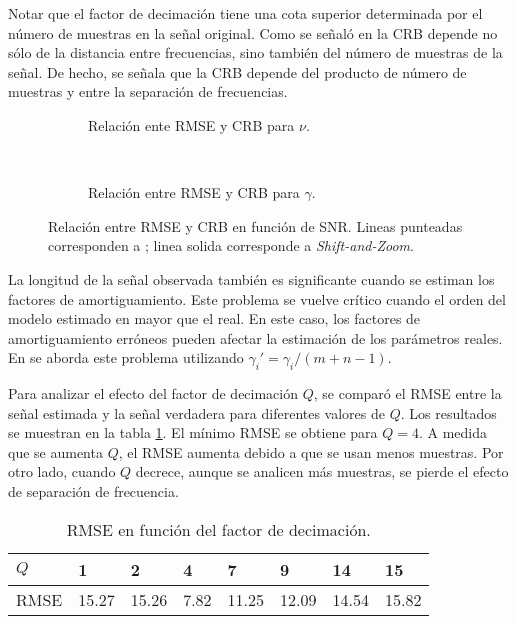			Notar que el factor de decimación tiene una cota superior determinada por el número de muestras en la señal original. Como se señaló en \cite{Yao1995} la CRB depende no sólo de la distancia entre frecuencias, sino también del número de muestras de la señal. De hecho, se señala que la CRB depende del producto de número de muestras y entre la separación de frecuencias.
			\begin{figure}[t]
				\begin{subfigure}{0.5\textwidth}
					\centering	
					\resizebox{\linewidth}{!}{}
					\caption{Relación ente RMSE y CRB para $\nu$.}
					\label{Fig:CRB_nu_ex1}
				\end{subfigure}
				~
				\begin{subfigure}{0.5\textwidth}
					\centering
					\resizebox{\linewidth}{!}{}
					\caption{Relación entre RMSE y CRB para $\gamma$.}
					\label{Fig:CRB_gamma_ex1}
				\end{subfigure}
				\caption{Relación entre RMSE y CRB en función de SNR. Lineas punteadas corresponden a \cite{Andersson2014}; linea solida corresponde a \emph{Shift-and-Zoom}.}
				\label{Fig:CRB_ex1}
			\end{figure}
			
			La longitud de la señal observada también es significante cuando se estiman los factores de amortiguamiento. Este problema se vuelve crítico cuando el orden del modelo estimado en mayor que el real. En este caso, los factores de amortiguamiento erróneos pueden afectar la estimación de los parámetros reales. En \cite{Hasan1982} se aborda este problema utilizando $\gamma_i' = \gamma_i/(m+n-1)$.
			
			Para analizar el efecto del factor de decimación $Q$, se comparó el RMSE entre la señal estimada y la señal verdadera para diferentes valores de $Q$. Los resultados se muestran en la tabla \ref{Table:RMSE_Q}. El mínimo RMSE se obtiene para $Q=4$. A medida que se aumenta $Q$, el RMSE aumenta debido a que se usan menos muestras. Por otro lado, cuando $Q$ decrece, aunque se analicen más muestras, se pierde el efecto de separación de frecuencia.
			
			\begin{table}[h!]
				\centering
				\begin{tabular}{llllllll}
					$Q$ & 1 & 2 & 4 & 7 & 9 & 14 & 15 \\ \hline
					RMSE & 15.27 & 15.26 & 7.82 & 11.25 & 12.09& 14.54 & 15.82 \\
				\end{tabular}
				\caption{RMSE en función del factor de decimación.}
				\label{Table:RMSE_Q}
			\end{table}						
			
